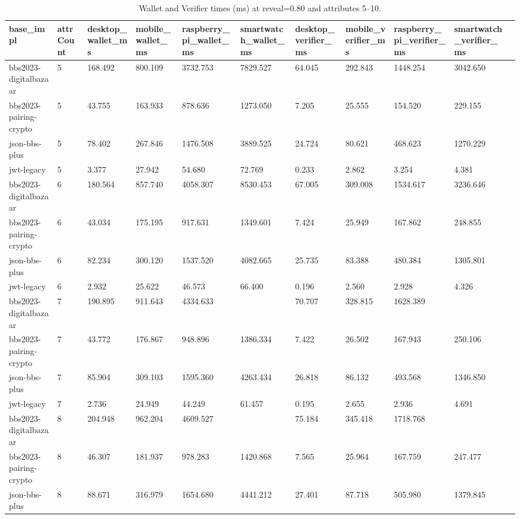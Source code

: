 \begin{table}[t]
\centering
\caption{Wallet and Verifier times (ms) at reveal=0.80 and attributes 5--10.}
\label{tab:times-filtered}
\begin{tabular}{lllllllllll}\toprule
base\_impl & attrCount & desktop\_wallet\_ms & mobile\_wallet\_ms & raspberry\_pi\_wallet\_ms & smartwatch\_wallet\_ms & desktop\_verifier\_ms & mobile\_verifier\_ms & raspberry\_pi\_verifier\_ms & smartwatch\_verifier\_ms \\\midrule
bbs2023-digitalbazaar & 5 & 168.492 & 800.109 & 3732.753 & 7829.527 & 64.045 & 292.843 & 1448.254 & 3042.650 \\
bbs2023-pairing-crypto & 5 & 43.755 & 163.933 & 878.636 & 1273.050 & 7.205 & 25.555 & 154.520 & 229.155 \\
json-bbs-plus & 5 & 78.402 & 267.846 & 1476.508 & 3889.525 & 24.724 & 80.621 & 468.623 & 1270.229 \\
jwt-legacy & 5 & 3.377 & 27.942 & 54.680 & 72.769 & 0.233 & 2.862 & 3.254 & 4.381 \\
bbs2023-digitalbazaar & 6 & 180.564 & 857.740 & 4058.307 & 8530.453 & 67.005 & 309.008 & 1534.617 & 3236.646 \\
bbs2023-pairing-crypto & 6 & 43.034 & 175.195 & 917.631 & 1349.601 & 7.424 & 25.949 & 167.862 & 248.855 \\
json-bbs-plus & 6 & 82.234 & 300.120 & 1537.520 & 4082.665 & 25.735 & 83.388 & 480.384 & 1305.801 \\
jwt-legacy & 6 & 2.932 & 25.622 & 46.573 & 66.400 & 0.196 & 2.560 & 2.928 & 4.326 \\
bbs2023-digitalbazaar & 7 & 190.895 & 911.643 & 4334.633 &  & 70.707 & 328.815 & 1628.389 &  \\
bbs2023-pairing-crypto & 7 & 43.772 & 176.867 & 948.896 & 1386.334 & 7.422 & 26.502 & 167.943 & 250.106 \\
json-bbs-plus & 7 & 85.904 & 309.103 & 1595.360 & 4263.434 & 26.818 & 86.132 & 493.568 & 1346.850 \\
jwt-legacy & 7 & 2.736 & 24.949 & 44.249 & 61.457 & 0.195 & 2.655 & 2.936 & 4.691 \\
bbs2023-digitalbazaar & 8 & 204.948 & 962.204 & 4609.527 &  & 75.184 & 345.418 & 1718.768 &  \\
bbs2023-pairing-crypto & 8 & 46.307 & 181.937 & 978.283 & 1420.868 & 7.565 & 25.964 & 167.759 & 247.477 \\
json-bbs-plus & 8 & 88.671 & 316.979 & 1654.680 & 4441.212 & 27.401 & 87.718 & 505.980 & 1379.845 \\

\end{tabular}
\end{table}
